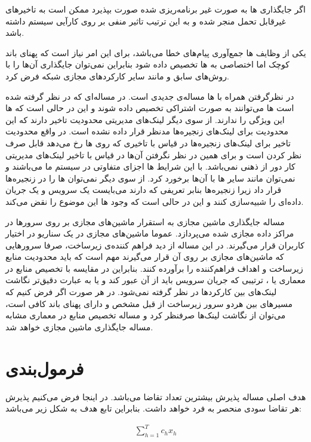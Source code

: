 اگر جایگذاری ها به صورت غیر برنامه‌ریزی شده صورت بپذیرد
ممکن است به تاخیرهای غیرقابل تحمل منجر شده و به این ترتیب تاثیر منفی بر روی کارآیی سیستم
داشته باشد.

یکی از وظایف ها جمع‌آوری پیام‌های خطا می‌باشد،
برای این امر نیاز است که پهنای باند کوچک اما اختصاصی به ها
تخصیص داده شود بنابراین نمی‌توان جایگذاری آن‌ها را با روش‌های سابق و مانند سایر
کارکردهای مجازی شبکه فرض کرد.

در نظرگرفتن  همراه با ها مساله‌ی جدیدی است.
در مساله‌ای که در نظر گرفته شده است ها می‌توانند به صورت اشتراکی
تخصیص داده شوند و این در حالی است که ها این ویژگی را ندارند.
از سوی دیگر لینک‌های مدیریتی محدودیت تاخیر دارند که این محدودیت برای لینک‌های زنجیره‌ها مدنظر قرار داده نشده است.
در واقع محدودیت تاخیر برای لینک‌های زنجیره‌ها در قیاس با تاخیری که روی ها رخ می‌دهد قابل صرف نظر کردن است و برای همین
در نظر نگرفتن آن‌ها در قیاس با تاخیر لینک‌های مدیریتی کار دور از ذهنی نمی‌باشد.
با این شرایط ها اجزای متفاوتی در سیستم ما می‌باشند و نمی‌توان مانند سایر ها با آن‌ها برخورد کرد.
از سوی دیگر نمی‌توان ها را در زنجیره‌ها قرار داد
زیرا زنجیره‌ها بنابر تعریفی که دارند می‌بایست یک سرویس و یک جریان داده‌ای را شبیه‌سازی کنند
و این در حالی است که وجود ها این موضوع را نقض می‌کند.

مساله جایگذاری ماشین مجازی به استقرار ماشین‌های مجازی بر روی سرورها در مراکز داده مجازی شده می‌پردازد.
عموما ماشین‌های مجازی در یک سناریو  در اختیار کاربران قرار می‌گیرند.
در این مساله از دید فراهم کننده‌ی زیرساخت، صرفا سرورهایی که ماشین‌های مجازی بر روی آن قرار می‌گیرند مهم است که باید محدودیت منابع زیرساخت
و اهداف فراهم‌کننده را برآورده کنند.
بنابراین در مقایسه با تخصیص منابع در معماری  یا ،
ترتیبی که جریان سرویس باید از آن عبور کند و یا به عبارت دقیق‌تر نگاشت لینک‌های بین کارکردها
در نظر گرفته نمی‌شود.
در هر صورت اگر فرض کنیم که مسیرهای بین هردو سرور زیرساخت از قبل مشخص و دارای پهنای باند کافی است،
می‌توان از نگاشت لینک‌ها صرفنظر کرد و مساله تخصیص منابع در معماری 
مشابه مساله جایگذاری ماشین مجازی خواهد شد.

\section{فرمول‌بندی}

هدف اصلی مساله پذیرش بیشترین تعداد تقاضا می‌باشد. در اینجا فرض می‌کنیم پذیرش هر تقاضا سودی منحصر به فرد خواهد داشت.
بنابراین تابع هدف به شکل زیر می‌باشد:

\begin{latin}\begin{align}
    \sum_{h=1}^{T} c_hx_h
\end{align}\end{latin}



